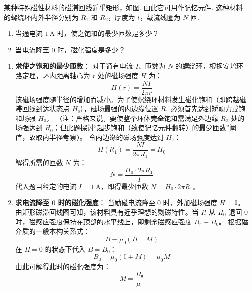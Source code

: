 \begin{exercise}\label{ex:19.9}
某种特殊磁性材料的磁滞回线近乎矩形，如图. 由此它可用作记忆元件. 这种材料的螺绕环内外半径分别为 $R_1$ 和 $R_2$，厚度为 $t$，载流线圈为 $N$ 匝. 
\begin{enumerate}
  \item[(a)] 当通电流 $1 \ \mathrm{A}$ 时，使之饱和的最少匝数是多少？
  \item[(b)] 当电流降至 $0$ 时，磁化强度是多少？
\end{enumerate}
\begin{center}
\end{center}
\end{exercise}
\begin{solution}
\begin{enumerate}
    \item[(a)] \textbf{求使之饱和的最少匝数}：
    对于通有电流 $I$、匝数为 $N$ 的螺绕环，根据安培环路定理，环内距离轴心为 $r$ 处的磁场强度 $H$ 为：
    $$ H(r) = \frac{N I}{2\pi r} $$
    该磁场强度随半径的增加而减小。为了使螺绕环材料发生磁化饱和（即跨越磁滞回线到达状态点 $H_0$），磁场最强的内边缘位置 $R_1$ 必须首先达到矫顽力或饱和场强 $H_0$。
    （注：严格来说，要使整个环体\textbf{完全}饱和需满足外边缘 $R_2$ 处的场强达到 $H_0$；但此题探讨“起步饱和（致使记忆元件翻转）的最少匝数”阈值，故取内半径考察）。
    令内边缘的磁场强度达到 $H_0$：
    $$ H(R_1) = \frac{N I}{2\pi R_1} = H_0 $$
    解得所需的匝数 $N$ 为：
    $$ N = \frac{H_0 \cdot 2\pi R_1}{I} $$
    代入题目给定的电流 $I = 1 \ \mathrm{A}$，即得最少匝数 $N = H_0 \cdot 2\pi R_1$。

    \item[(b)] \textbf{求电流降至 $0$ 时的磁化强度}：
    当励磁电流降至 $0$ 时，外加磁场强度 $H = 0$。
    由矩形磁滞回线图可知，该材料具有近乎理想的剩磁特性。当 $H$ 从 $H_0$ 退回 $0$ 时，磁感应强度保持在顶部的水平线上，即剩余磁感应强度 $B_r = B_0$。
    根据磁介质的一般本构关系式：
    $$ B = \mu_0 (H + M) $$
    在 $H = 0$ 的状态下代入 $B = B_0$：
    $$ B_0 = \mu_0 (0 + M) = \mu_0 M $$
    由此可解得此时的磁化强度为：
    $$ M = \frac{B_0}{\mu_0} $$
\end{enumerate}
\end{solution}


